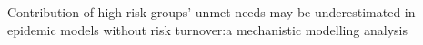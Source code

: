 Contribution of high risk groups' unmet needs
may be underestimated in epidemic models without risk turnover:\linebreak[1]
a mechanistic modelling analysis